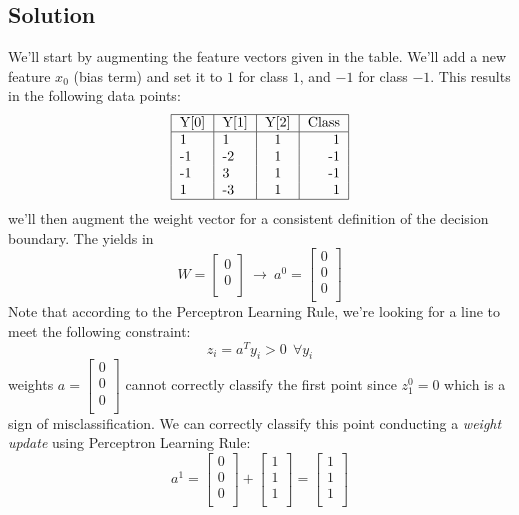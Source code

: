 \documentclass[12pt]{article}
\numberwithin{equation}{section}
\numberwithin{table}{section}
\numberwithin{figure}{section}
\begin{document}
\subsection*{Solution}
We'll start by augmenting the feature vectors given in the table. We'll add a new feature $x_0$ (bias term) and set it to $1$ for class $1$, and $-1$ for class $-1$. This results in the following data points:
$$
\begin{tabular}{ | l | l | c | r |}
	\hline	
	Y[0] & Y[1] & Y[2] & Class \\ \hline		
	1 & 1 & 1 & 1 \\
	-1 & -2 & 1 & -1 \\
	-1 & 3 & 1 & -1 \\
	1 & -3 & 1 & 1 \\
	\hline  
\end{tabular}
$$
we'll then augment the weight vector for a consistent definition of the decision boundary. The yields in
$$
 	W = \begin{bmatrix}
	0 \\
	0 \\
	\end{bmatrix}\ \rightarrow\  	a^0 = \begin{bmatrix}
	0 \\
	0 \\
	0 \\
	\end{bmatrix} 
$$
Note that according to the Perceptron Learning Rule, we're looking for a line to meet the following constraint:
\begin{equation}
	z_i = a^Ty_i > 0\ \  \forall y_i
\end{equation}
weights $a = \begin{bmatrix}
0 \\
0 \\
0 \\
\end{bmatrix} $ cannot correctly classify the first point since $z_1^0 = 0$ which is a sign of misclassification. We can correctly classify this point conducting a \textit{weight update} using Perceptron Learning Rule:
$$
	a^1 = \begin{bmatrix}
	0 \\
	0 \\
	0 \\
	\end{bmatrix} + \begin{bmatrix}
	1 \\
	1 \\
	1 \\
	\end{bmatrix} = \begin{bmatrix}
	1 \\
	1 \\
	1 \\
	\end{bmatrix}
$$
\end{document}
